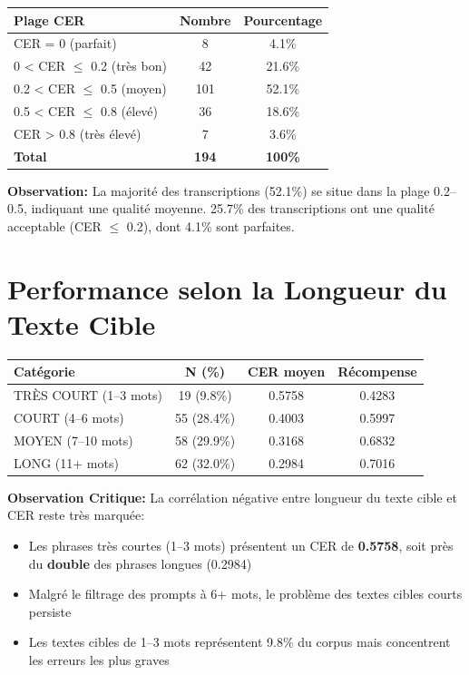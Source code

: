 \documentclass[12pt,a4paper]{article}
\begin{document}
\begin{center}
\begin{tabular}{|l|c|c|}
\hline
\textbf{Plage CER} & \textbf{Nombre} & \textbf{Pourcentage} \\
\hline
CER = 0 (parfait) & 8 & 4.1\% \\
0 < CER $\leq$ 0.2 (très bon) & 42 & 21.6\% \\
0.2 < CER $\leq$ 0.5 (moyen) & 101 & 52.1\% \\
0.5 < CER $\leq$ 0.8 (élevé) & 36 & 18.6\% \\
CER > 0.8 (très élevé) & 7 & 3.6\% \\
\hline
\textbf{Total} & \textbf{194} & \textbf{100\%} \\
\hline
\end{tabular}
\end{center}

\textbf{Observation:} La majorité des transcriptions (52.1\%) se situe dans la plage 0.2--0.5, indiquant une qualité moyenne. 25.7\% des transcriptions ont une qualité acceptable (CER $\leq$ 0.2), dont 4.1\% sont parfaites.

\section{Performance selon la Longueur du Texte Cible}

\begin{center}
\begin{tabular}{|l|c|c|c|}
\hline
\textbf{Catégorie} & \textbf{N (\%)} & \textbf{CER moyen} & \textbf{Récompense} \\
\hline
TRÈS COURT (1--3 mots) & 19 (9.8\%) & 0.5758 & 0.4283 \\
COURT (4--6 mots) & 55 (28.4\%) & 0.4003 & 0.5997 \\
MOYEN (7--10 mots) & 58 (29.9\%) & 0.3168 & 0.6832 \\
LONG (11+ mots) & 62 (32.0\%) & 0.2984 & 0.7016 \\
\hline
\end{tabular}
\end{center}

\textbf{Observation Critique:} La corrélation négative entre longueur du texte cible et CER reste très marquée:
\begin{itemize}
    \item Les phrases très courtes (1--3 mots) présentent un CER de \textbf{0.5758}, soit près du \textbf{double} des phrases longues (0.2984)
    \item Malgré le filtrage des prompts à 6+ mots, le problème des textes cibles courts persiste
    \item Les textes cibles de 1--3 mots représentent 9.8\% du corpus mais concentrent les erreurs les plus graves
\end{itemize}
\end{document}
